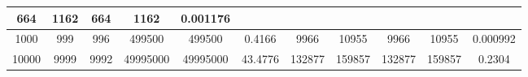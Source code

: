 \documentclass[a4paper,12pt]{article}
\begin{document}
\begin{table}[h]
\begin{tabular}{|c|ccccc|ccccc|}
            \multicolumn{1}{c|}{664} &
            \multicolumn{1}{c|}{1162} &
            \multicolumn{1}{c|}{664} &
            \multicolumn{1}{c|}{1162} &
            0.001176 \\ \hline
            1000 &
            \multicolumn{1}{c|}{999} &
            \multicolumn{1}{c|}{996} &
            \multicolumn{1}{c|}{499500} &
            \multicolumn{1}{c|}{499500} &
            0.4166 &
            \multicolumn{1}{c|}{9966} &
            \multicolumn{1}{c|}{10955} &
            \multicolumn{1}{c|}{9966} &
            \multicolumn{1}{c|}{10955} &
            0.000992 \\ \hline
            10000 &
            \multicolumn{1}{c|}{9999} &
            \multicolumn{1}{c|}{9992} &
            \multicolumn{1}{c|}{49995000} &
            \multicolumn{1}{c|}{49995000} &
            43.4776 &
            \multicolumn{1}{c|}{132877} &
            \multicolumn{1}{c|}{159857} &
            \multicolumn{1}{c|}{132877} &
            \multicolumn{1}{c|}{159857} &
            0.2304 \\ \hline
        \end{tabular}
    \end{table}
\end{document}
